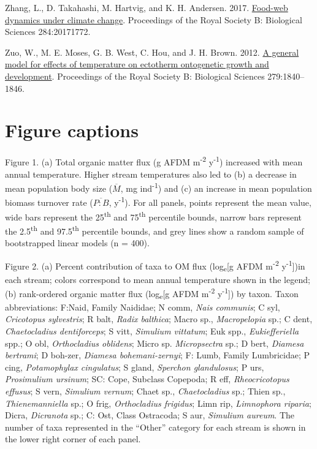 \documentclass[
]{article}
\newlength{\cslhangindent}
\newlength{\cslentryspacingunit} %
\newenvironment{CSLReferences}[2] %
 {%
  \setlength{\parindent}{0pt}
  \ifodd #1
  \let\oldpar\par
  \def\par{\hangindent=\cslhangindent\oldpar}
  \fi
  \setlength{\parskip}{#2\cslentryspacingunit}
 }%
 {}
\numberwithin{equation}
\begin{document}
\begin{CSLReferences}{1}{0}
\leavevmode{}%
Zhang, L., D. Takahashi, M. Hartvig, and K. H. Andersen. 2017.
\href{https://doi.org/10.1098/rspb.2017.1772}{Food-web dynamics under
climate change}. Proceedings of the Royal Society B: Biological Sciences
284:20171772.

\leavevmode{}%
Zuo, W., M. E. Moses, G. B. West, C. Hou, and J. H. Brown. 2012.
\href{https://doi.org/10.1098/rspb.2011.2000}{A general model for
effects of temperature on ectotherm ontogenetic growth and development}.
Proceedings of the Royal Society B: Biological Sciences 279:1840--1846.

\end{CSLReferences}

\newpage

\hypertarget{figure-captions}{%
\section{Figure captions}\label{figure-captions}}

Figure 1. (a) Total organic matter flux (g AFDM m\textsuperscript{-2}
y\textsuperscript{-1}) increased with mean annual temperature. Higher
stream temperatures also led to (b) a decrease in mean population body
size (\(\overline{M}\), mg ind\textsuperscript{-1}) and (c) an increase
in mean population biomass turnover rate (\(\overline{P:B}\),
y\textsuperscript{-1}). For all panels, points represent the mean value,
wide bars represent the 25\textsuperscript{th} and
75\textsuperscript{th} percentile bounds, narrow bars represent the
2.5\textsuperscript{th} and 97.5\textsuperscript{th} percentile bounds,
and grey lines show a random sample of bootstrapped linear models (n =
400).

Figure 2. (a) Percent contribution of taxa to OM flux
(log\textsubscript{e}{[}g AFDM m\textsuperscript{-2}
y\textsuperscript{-1}{]})in each stream; colors correspond to mean
annual temperature shown in the legend; (b) rank-ordered organic matter
flux (log\textsubscript{e}{[}g AFDM m\textsuperscript{-2}
y\textsuperscript{-1}{]}) by taxon. Taxon abbreviations: F:Naid, Family
Naididae; N comm, \emph{Nais communis}; C syl, \emph{Cricotopus
sylvestris}; R balt, \emph{Radix balthica}; Macro sp.,
\emph{Macropelopia} sp.; C dent, \emph{Chaetocladius dentiforceps}; S
vitt, \emph{Simulium vittatum}; Euk spp., \emph{Eukiefferiella} spp.; O
obl, \emph{Orthocladius oblidens}; Micro sp. \emph{Micropsectra} sp.; D
bert, \emph{Diamesa bertrami}; D boh-zer, \emph{Diamesa
bohemani-zernyi}; F: Lumb, Family Lumbricidae; P cing,
\emph{Potamophylax cingulatus}; S gland, \emph{Sperchon glandulosus}; P
urs, \emph{Prosimulium ursinum}; SC: Cope, Subclass Copepoda; R eff,
\emph{Rheocricotopus effusus}; S vern, \emph{Simulium vernum}; Chaet
sp., \emph{Chaetocladius} sp.; Thien sp., \emph{Thienemanniella} sp.; O
frig, \emph{Orthocladius frigidus}; Limn rip, \emph{Limnophora riparia};
Dicra, \emph{Dicranota} sp.; C: Ost, Class Ostracoda; S aur,
\emph{Simulium aureum}. The number of taxa represented in the ``Other''
category for each stream is shown in the lower right corner of each
panel.
\end{document}
